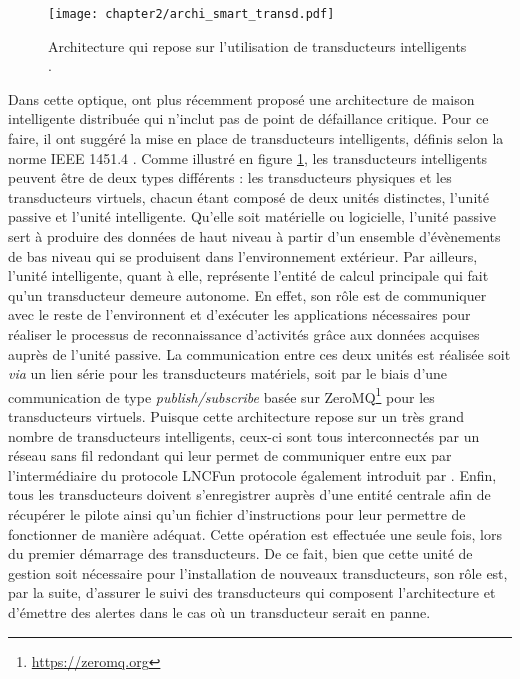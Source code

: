 \begin{figure}[H]
	\centering
	\texttt{[image: chapter2/archi\_smart\_transd.pdf]}
	\caption[Architecture qui repose sur l'utilisation de transducteurs intelligents.]{Architecture qui repose sur l'utilisation de transducteurs intelligents \citep{Plantevin2018}.}
	\label{fig:archi_smart_transd}
\end{figure}

Dans cette optique, \cite{Plantevin2018} ont plus récemment proposé une architecture de maison intelligente distribuée qui n'inclut pas de point de défaillance critique. Pour ce faire, il ont suggéré la mise en place de transducteurs intelligents, définis selon la norme IEEE 1451.4 \citep{InstituteofElectricalandElectronicsEngineers1999}. Comme illustré en figure \ref{fig:archi_smart_transd}, les transducteurs intelligents peuvent être de deux types différents : les transducteurs physiques et les transducteurs virtuels, chacun étant composé de deux unités distinctes, l'unité passive et l'unité intelligente. Qu'elle soit matérielle ou logicielle, l'unité passive sert à produire des données de haut niveau à partir d'un ensemble d'évènements de bas niveau qui se produisent dans l'environnement extérieur. Par ailleurs, l'unité intelligente, quant à elle, représente l'entité de calcul principale qui fait qu'un transducteur demeure autonome. En effet, son rôle est de communiquer avec le reste de l'environnent et d'exécuter les applications nécessaires pour réaliser le processus de reconnaissance d'activités grâce aux données acquises auprès de l'unité passive. La communication entre ces deux unités est réalisée soit \textit{via} un lien série pour les transducteurs matériels, soit par le biais d'une communication de type \textit{publish/subscribe} basée sur ZeroMQ\footnote{\url{https://zeromq.org}} pour les transducteurs virtuels. Puisque cette architecture repose sur un très grand nombre de transducteurs intelligents, ceux-ci sont tous interconnectés par un réseau sans fil redondant qui leur permet de communiquer entre eux par l'intermédiaire du protocole \ac{LNCF}\textemdash un protocole également introduit par \cite{Plantevin2017}. Enfin, tous les transducteurs doivent s'enregistrer auprès d'une entité centrale afin de récupérer le pilote ainsi qu'un fichier d'instructions pour leur permettre de fonctionner de manière adéquat. Cette opération est effectuée une seule fois, lors du premier démarrage des transducteurs. De ce fait, bien que cette unité de gestion soit nécessaire pour l'installation de nouveaux transducteurs, son rôle est, par la suite, d'assurer le suivi des transducteurs qui composent l'architecture et d'émettre des alertes dans le cas où un transducteur serait en panne.

